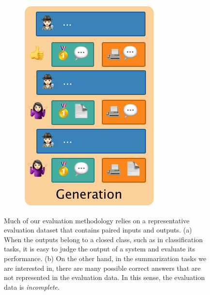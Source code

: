 \begin{figure}
\begin{subfigure}{0.25\textwidth}
  \includegraphics[width=\textwidth]{figures/incompleteness-generation}
  \end{subfigure}
  \caption[Complete and incomplete evaluation sets]{\label{fig:intro:evaluation-data} 
  Much of our evaluation methodology relies on a representative evaluation dataset that contains paired inputs and outputs.
  (a) When the outputs belong to a closed class, such as in classification tasks, it is easy to judge the output of a system and evaluate its performance.
  (b) On the other hand, in the summarization tasks we are interested in, there are many possible correct answers that are not represented in the evaluation data. In this sense, the evaluation data is \textit{incomplete}.
  }
\end{figure}
